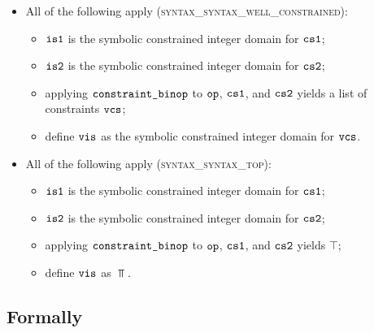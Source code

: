 \begin{itemize}
  \item All of the following apply (\textsc{syntax\_syntax\_well\_constrained}):
  \begin{itemize}
    \item $\visone$ is the symbolic constrained integer domain for $\csone$;
    \item $\vistwo$ is the symbolic constrained integer domain for $\cstwo$;
    \item applying $\constraintbinop$ to $\op$, $\csone$, and $\cstwo$ yields
          a list of constraints $\vcs$;
    \item define $\vis$ as the symbolic constrained integer domain for $\vcs$.
  \end{itemize}

  \item All of the following apply (\textsc{syntax\_syntax\_top}):
  \begin{itemize}
    \item $\visone$ is the symbolic constrained integer domain for $\csone$;
    \item $\vistwo$ is the symbolic constrained integer domain for $\cstwo$;
    \item applying $\constraintbinop$ to $\op$, $\csone$, and $\cstwo$ yields $\top$;
    \item define $\vis$ as $\Top$.
  \end{itemize}
\end{itemize}

\subsection{Formally}

\begin{mathpar}
\end{mathpar}

